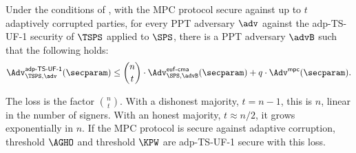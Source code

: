 \begin{lemma}\label{lem:tsps-adaptive} Under the conditions of
, with the MPC protocol secure against up
to $t$ adaptively corrupted parties, for every PPT adversary $\adv$ against the
adp-TS-UF-1 security of $\TSPS$ applied to $\SPS$, there is a PPT adversary
$\advB$ such that the following holds:
  \begin{equation*}
    \Adv_{\TSPS, \adv}^{\mathsf{adp\text{-}TS\text{-}UF\text{-}1}}(\secparam) \leq \binom{n}{t}
\cdot \Adv_{\SPS, \advB}^{\mathsf{euf\text{-}cma}}(\secparam) + q \cdot
\Adv^{\mathsf{mpc}}(\secparam).
  \end{equation*}
\end{lemma}

The loss is the factor $\binom{n}{t}$. With a dishonest majority, $t = n-1$,
this is $n$, linear in the number of signers. With an honest majority, $t
\approx n/2$, it grows exponentially in $n$. If the MPC protocol is secure
against adaptive corruption, threshold $\AGHO$ and threshold $\KPW$ are
adp-TS-UF-1 secure with this loss.

